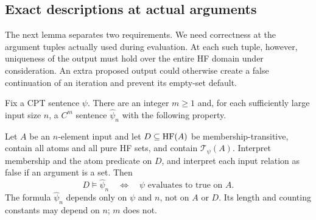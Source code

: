 \subsection{Exact descriptions at actual arguments}

The next lemma separates two requirements.  We need correctness at the
argument tuples actually used during evaluation.  At each such tuple,
however, uniqueness of the output must hold over the entire HF domain
under consideration. An extra proposed output could otherwise create a
false continuation of an iteration and prevent its empty-set default.

\begin{lemma}
\label{eval:description}
Fix a CPT sentence \(\psi\).  There are an integer \(m\ge1\) and, for
each sufficiently large input size \(n\), a \(C^m\) sentence
\(\widehat\psi_n\) with the following property.

Let \(A\) be an \(n\)-element input and let \(D\subseteq\operatorname{HF}(A)\) be
membership-transitive, contain all atoms and all pure HF sets, and contain
\(\mathcal T_\psi(A)\).  Interpret membership and the atom predicate on
\(D\), and interpret each input relation as false if an argument is a
set.  Then
\[
 D\models\widehat\psi_n
       \quad\Longleftrightarrow\quad
 \psi\text{ evaluates to true on }A.
\]
The formula \(\widehat\psi_n\) depends only on \(\psi\) and \(n\), not on
\(A\) or \(D\).  Its length and counting constants may depend on \(n\);
\(m\) does not.
\end{lemma}


